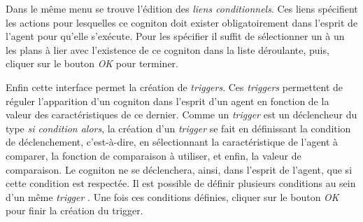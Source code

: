 Dans le même menu se trouve l'édition des\textit{ liens conditionnels}. Ces liens spécifient les actions pour lesquelles ce cogniton doit exister obligatoirement dans l'esprit de l'agent pour qu'elle s'exécute. Pour les spécifier il suffit de sélectionner un à un les plans à lier avec l'existence de ce cogniton dans la liste déroulante, puis, cliquer sur le bouton \textit{OK} pour terminer.

Enfin cette interface permet la création de \textit{triggers}. Ces \textit{triggers} permettent de réguler l'apparition d'un cogniton dans l'esprit d'un agent en fonction de la valeur des caractéristiques de ce dernier. Comme un \textit{trigger} est un déclencheur du type \textit{si condition alors}, la création d'un \textit{trigger} se fait en définissant la condition de déclenchement, c'est-à-dire, en sélectionnant la caractéristique de l'agent à comparer, la fonction de comparaison à utiliser, et enfin, la valeur de comparaison. Le cogniton ne se déclenchera, ainsi, dans l'esprit de l'agent, que si cette condition est respectée. 
Il est possible de définir plusieurs conditions au sein d'un même 
 \textit{trigger} . Une fois ces conditions définies, cliquer sur le bouton \textit{OK} pour finir la création du trigger.
 

	
